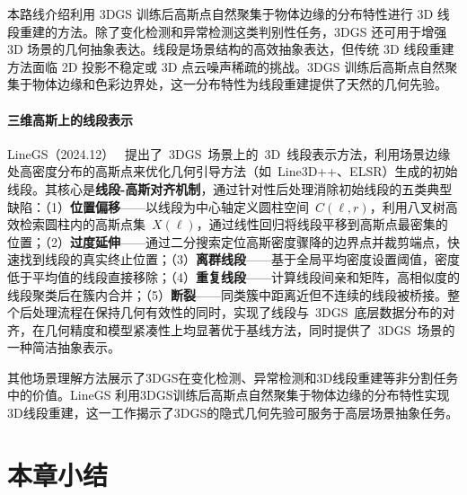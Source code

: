 本路线介绍利用 3DGS 训练后高斯点自然聚集于物体边缘的分布特性进行 3D 线段重建的方法。除了变化检测和异常检测这类判别性任务，3DGS 还可用于增强 3D 场景的几何抽象表达。线段是场景结构的高效抽象表达，但传统 3D 线段重建方法面临 2D 投影不稳定或 3D 点云噪声稀疏的挑战。3DGS 训练后高斯点自然聚集于物体边缘和色彩边界处，这一分布特性为线段重建提供了天然的几何先验。

\paragraph{三维高斯上的线段表示}

LineGS（2024.12）~\cite{2412_00477} 提出了~3DGS~场景上的~3D~线段表示方法，利用场景边缘处高密度分布的高斯点来优化几何引导方法（如~Line3D++、ELSR）生成的初始线段。其核心是\textbf{线段-高斯对齐机制}，通过针对性后处理消除初始线段的五类典型缺陷：（1）\textbf{位置偏移}——以线段为中心轴定义圆柱空间~$C(\ell, r)$，利用八叉树高效检索圆柱内的高斯点集~$X(\ell)$，通过线性回归将线段平移到高斯点最密集的位置；（2）\textbf{过度延伸}——通过二分搜索定位高斯密度骤降的边界点并裁剪端点，快速找到线段的真实终止位置；（3）\textbf{离群线段}——基于全局平均密度设置阈值，密度低于平均值的线段直接移除；（4）\textbf{重复线段}——计算线段间亲和矩阵，高相似度的线段聚类后在簇内合并；（5）\textbf{断裂}——同类簇中距离近但不连续的线段被桥接。整个后处理流程在保持几何有效性的同时，实现了线段与~3DGS~底层数据分布的对齐，在几何精度和模型紧凑性上均显著优于基线方法，同时提供了~3DGS~场景的一种简洁抽象表示。

\begin{takeaway}
其他场景理解方法展示了3DGS在变化检测、异常检测和3D线段重建等非分割任务中的价值。LineGS 利用3DGS训练后高斯点自然聚集于物体边缘的分布特性实现3D线段重建，这一工作揭示了3DGS的隐式几何先验可服务于高层场景抽象任务。
\end{takeaway}




\section*{本章小结}

